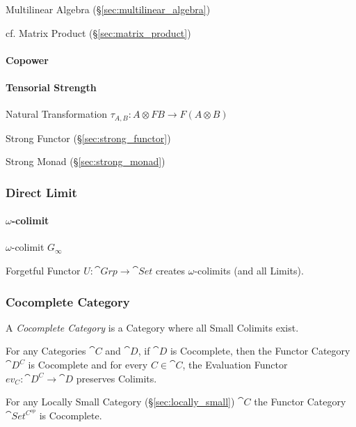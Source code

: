 Multilinear Algebra (\S\ref{sec:multilinear_algebra})

cf. Matrix Product (\S\ref{sec:matrix_product})



\paragraph{Copower}\label{sec:copower}\hfill

\paragraph{Tensorial Strength}\label{sec:tensorial_strength}\hfill

Natural Transformation $\tau_{A,B} : A \otimes F B \rightarrow F (A
\otimes B)$

Strong Functor (\S\ref{sec:strong_functor})

Strong Monad (\S\ref{sec:strong_monad})



\subsubsection{Direct Limit}\label{sec:direct_limit}

\paragraph{$\omega$-colimit}\label{sec:omega_colimit}\hfill

$\omega$-colimit $G_\infty$

Forgetful Functor $U : \cat{Grp} \rightarrow \cat{Set}$ creates
$\omega$-colimits (and all Limits). \cite{awodey06}



\subsubsection{Cocomplete Category}\label{sec:cocomplete_category}

A \emph{Cocomplete Category} is a Category where all Small Colimits
exist.

For any Categories $\cat{C}$ and $\cat{D}$, if $\cat{D}$ is
Cocomplete, then the Functor Category $\cat{D^C}$ is Cocomplete and
for every $C \in \cat{C}$, the Evaluation Functor $ev_C :
\cat{D^C} \rightarrow \cat{D}$ preserves Colimits.

For any Locally Small Category (\S\ref{sec:locally_small})
$\cat{C}$ the Functor Category $\cat{Set^{C^{op}}}$ is
Cocomplete.

